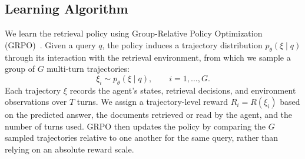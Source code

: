 \documentclass[11pt]{article}
\newcommand{\ml}[1]{\textcolor{orange}{\bf [lan: #1]}}
\newcommand{\jk}[1]{\textcolor{olive}{\bf [sf: #1]}}
\begin{document}
\subsection{Learning Algorithm}
\label{sec:method-learning-alg}

We learn the retrieval policy using Group-Relative Policy Optimization (GRPO)~\cite{shao2024deepseekmath}. Given a query \(q\), the policy induces a trajectory distribution \(p_\theta(\xi \mid q)\) through its interaction with the retrieval environment, from which we sample a group of \(G\) multi-turn trajectories:
\[
\xi_i \sim p_\theta(\xi \mid q), \qquad i=1,\ldots,G.
\]
Each trajectory $\xi$ records the agent’s states, retrieval decisions, and environment observations over \(T\) turns. We assign a trajectory-level reward \(R_i = R(\xi_i)\) based on the predicted answer, the documents retrieved or read by the agent, and the number of turns used. GRPO then updates the policy by comparing the \(G\) sampled trajectories relative to one another for the same query, rather than relying on an absolute reward scale.


\end{document}

